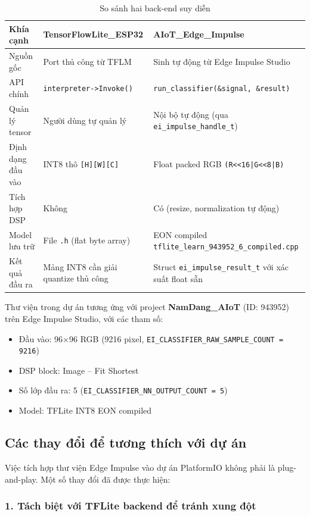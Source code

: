 \documentclass[12pt,a4paper]{article}
\begin{document}
\begin{table}[H]
\centering
\caption{So sánh hai back-end suy diễn}
\begin{tabularx}{\linewidth}{@{}l X X@{}}
\toprule
\textbf{Khía cạnh} & \textbf{TensorFlowLite\_ESP32} & \textbf{AIoT\_Edge\_Impulse} \\
\midrule
Nguồn gốc & Port thủ công từ TFLM & Sinh tự động từ Edge Impulse Studio \\
API chính & \texttt{interpreter->Invoke()} & \texttt{run\_classifier(\&signal, \&result)} \\
Quản lý tensor & Người dùng tự quản lý & Nội bộ tự động (qua \texttt{ei\_impulse\_handle\_t}) \\
Định dạng đầu vào & INT8 thô \texttt{[H][W][C]} & Float packed RGB \texttt{(R<<16|G<<8|B)} \\
Tích hợp DSP & Không & Có (resize, normalization tự động) \\
Model lưu trữ & File \texttt{.h} (flat byte array) & EON compiled \texttt{tflite\_learn\_943952\_6\_compiled.cpp} \\
Kết quả đầu ra & Mảng INT8 cần giải quantize thủ công & Struct \texttt{ei\_impulse\_result\_t} với xác suất float sẵn \\
\bottomrule
\end{tabularx}
\end{table}

Thư viện trong dự án tương ứng với project \textbf{NamDang\_AIoT} (ID: 943952) trên Edge Impulse Studio, với các tham số:
\begin{itemize}
  \item Đầu vào: 96×96 RGB (9216 pixel, \texttt{EI\_CLASSIFIER\_RAW\_SAMPLE\_COUNT = 9216})
  \item DSP block: Image -- Fit Shortest
  \item Số lớp đầu ra: 5 (\texttt{EI\_CLASSIFIER\_NN\_OUTPUT\_COUNT = 5})
  \item Model: TFLite INT8 EON compiled
\end{itemize}

\subsection{Các thay đổi để tương thích với dự án}

Việc tích hợp thư viện Edge Impulse vào dự án PlatformIO không phải là plug-and-play. Một số thay đổi đã được thực hiện:

\subsubsection*{1. Tách biệt với TFLite backend để tránh xung đột}
\end{document}
